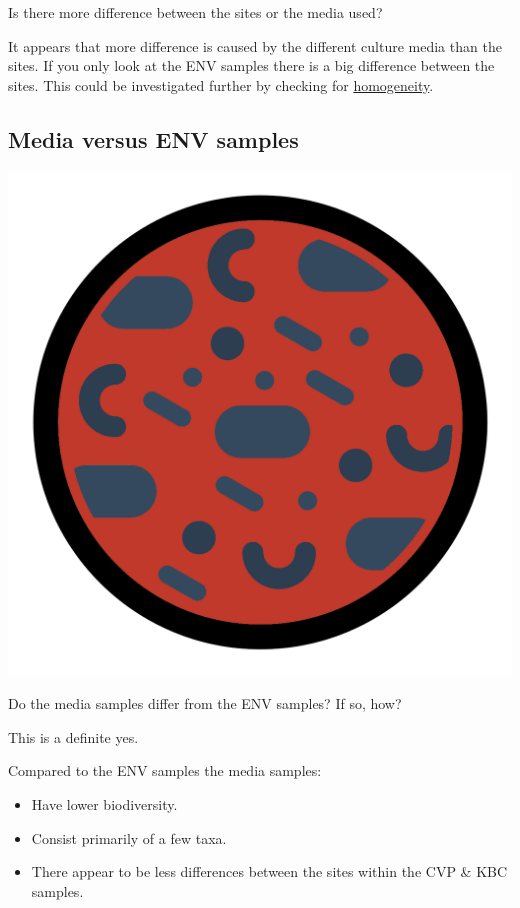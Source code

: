 \documentclass[
]{book}
\providecommand{\tightlist}{%
  \setlength{\itemsep}{0pt}\setlength{\parskip}{0pt}}
\begin{document}
Is there more difference between the sites or the media used?

It appears that more difference is caused by the different culture media than the sites.
If you only look at the ENV samples there is a big difference between the sites.
This could be investigated further by checking for \href{https://microbiome.github.io/tutorials/PERMANOVA.html}{homogeneity}.

\hypertarget{media-versus-env-samples}{%
\subsection{Media versus ENV samples}\label{media-versus-env-samples}}

\includegraphics{figures/petri.png}

Do the media samples differ from the ENV samples? If so, how?

This is a definite yes.

Compared to the ENV samples the media samples:

\begin{itemize}
\tightlist
\item
  Have lower biodiversity.
\item
  Consist primarily of a few taxa.
\item
  There appear to be less differences between the sites within the CVP \& KBC samples.
\end{itemize}
\end{document}
